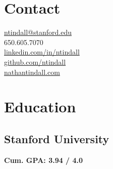 \documentclass[letterpaper]{deedy-resume} %
\begin{document}




\begin{minipage}[t]{0.33\textwidth} %

\section{Contact}
\href{mailto:ntindall@stanford.edu}{ntindall@stanford.edu}\\
650.605.7070\\
\href{https://www.linkedin.com/in/ntindall}{linkedin.com/in/ntindall}\\
\href{https://www.github.com/ntindall}{github.com/ntindall} \\
\href{http://www.nathantindall.com}{nathantindall.com}

\sectionspace %


\section{Education}

\subsection{Stanford University}

\textbf{Cum. GPA: 3.94 / 4.0}

%
%
%


\end{minipage}
\end{document}
